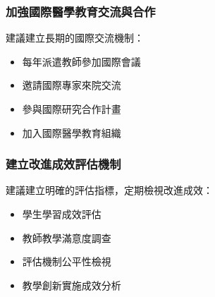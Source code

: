 \documentclass[12pt,a4paper]{article}
\begin{document}
\subsubsection{加強國際醫學教育交流與合作}

建議建立長期的國際交流機制：
\begin{itemize}[nosep]
    \item 每年派遣教師參加國際會議
    \item 邀請國際專家來院交流
    \item 參與國際研究合作計畫
    \item 加入國際醫學教育組織
\end{itemize}






\subsubsection{建立改進成效評估機制}

建議建立明確的評估指標，定期檢視改進成效：
\begin{itemize}[nosep]
    \item 學生學習成效評估
    \item 教師教學滿意度調查
    \item 評估機制公平性檢視
    \item 教學創新實施成效分析
\end{itemize}
\end{document}
